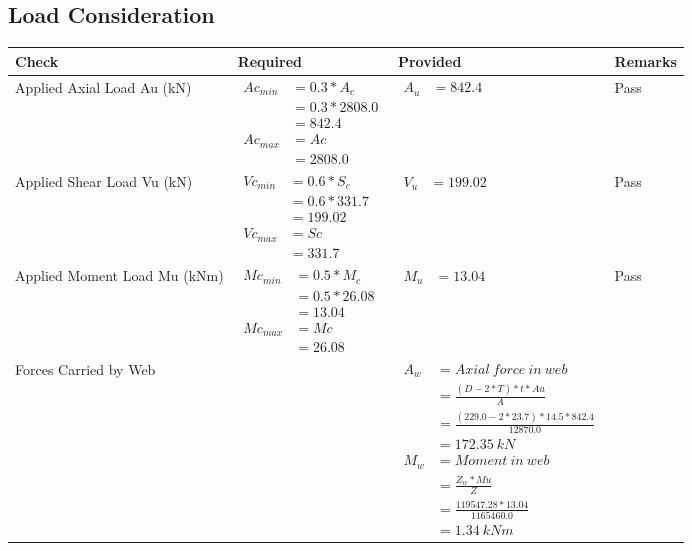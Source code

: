 \documentclass{article}%
\begin{document}
\subsection{Load Consideration}%
\label{subsec:LoadConsideration}%
\renewcommand{\arraystretch}{1.2}%
\begin{longtable}{|p{4cm}|p{3.5cm}|p{6.5cm}|p{1.5cm}|}%
\hline%
\rowcolor{OsdagGreen}%
Check&Required&Provided&Remarks\\%
\hline%
\endhead%
\hline%
Applied Axial Load Au (kN)&$\begin{aligned} Ac_{min} &= 0.3 * A_c\\ &= 0.3 *2808.0\\ &=842.4\\ Ac_{max} &= Ac \\ &=2808.0\end{aligned}$&$\begin{aligned} A_u &=842.4\end{aligned}$&Pass\\%
\hline%
Applied Shear Load Vu (kN)&$\begin{aligned} Vc_{min} &= 0.6 * S_c\\ &= 0.6 *331.7\\ &=199.02\\ Vc_{max} &= Sc \\ &=331.7\end{aligned}$&$\begin{aligned} V_u &=199.02\end{aligned}$&Pass\\%
\hline%
Applied Moment Load Mu (kNm)&$\begin{aligned} Mc_{min} &= 0.5 * M_c\\ &= 0.5 *26.08\\ &=13.04\\  Mc_{max} &= Mc \\ &=26.08\end{aligned}$&$\begin{aligned} M_u &=13.04\end{aligned}$&Pass\\%
\hline%
Forces Carried by Web&&$\begin{aligned}A_w &= Axial~ force~ in~ web  \\   &= \frac{(D- 2*T)*t* Au }{A} \\ &= \frac{(229.0- 2*23.7)*14.5*842.4 }{12870.0} \\ &=172.35~ kN\\ M_w &= Moment ~in ~web  \\  &= \frac{Z_w * Mu}{Z} \\ &= \frac{119547.28 * 13.04}{1165460.0} \\ &=1.34~{kNm}\end{aligned}$&\\%

\end{longtable}
\end{document}
